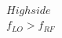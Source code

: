 \documentclass[preview]{standalone}
\begin{document}
\begin{align*}
High side\\f_{LO} > f_{RF}
\end{align*}
\end{document}
